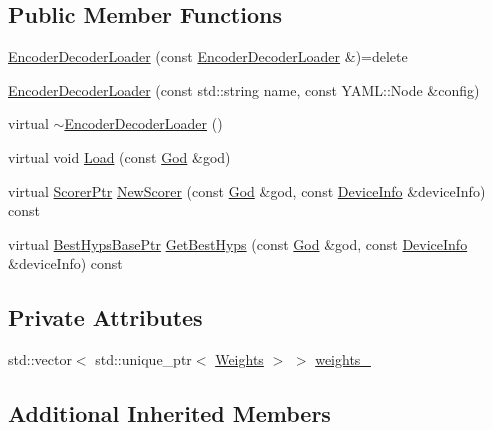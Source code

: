 \subsection*{Public Member Functions}
\begin{DoxyCompactItemize}
\item 
\hyperlink{classamunmt_1_1GPU_1_1EncoderDecoderLoader_ae76e1a60df4b709ddec5027089d45a78}{Encoder\+Decoder\+Loader} (const \hyperlink{classamunmt_1_1GPU_1_1EncoderDecoderLoader}{Encoder\+Decoder\+Loader} \&)=delete
\item 
\hyperlink{classamunmt_1_1GPU_1_1EncoderDecoderLoader_ae44ecf946eff763eb7d5b200831806be}{Encoder\+Decoder\+Loader} (const std\+::string name, const Y\+A\+M\+L\+::\+Node \&config)
\item 
virtual \hyperlink{classamunmt_1_1GPU_1_1EncoderDecoderLoader_ad635f6c9f1dd9baa2ce67251fd717236}{$\sim$\+Encoder\+Decoder\+Loader} ()
\item 
virtual void \hyperlink{classamunmt_1_1GPU_1_1EncoderDecoderLoader_a4f04240f2c79ce1d0e674a3b90c256e5}{Load} (const \hyperlink{classamunmt_1_1God}{God} \&god)
\item 
virtual \hyperlink{namespaceamunmt_a703e88438d533fef1db5cc95060b36f0}{Scorer\+Ptr} \hyperlink{classamunmt_1_1GPU_1_1EncoderDecoderLoader_a05b20df78aad262d9ef37c994f3c12eb}{New\+Scorer} (const \hyperlink{classamunmt_1_1God}{God} \&god, const \hyperlink{structamunmt_1_1DeviceInfo}{Device\+Info} \&device\+Info) const 
\item 
virtual \hyperlink{namespaceamunmt_a4a9522da34de52554ec07cedc30361b8}{Best\+Hyps\+Base\+Ptr} \hyperlink{classamunmt_1_1GPU_1_1EncoderDecoderLoader_a7436adba88a7f89f96d5c6ebf5ee8fe3}{Get\+Best\+Hyps} (const \hyperlink{classamunmt_1_1God}{God} \&god, const \hyperlink{structamunmt_1_1DeviceInfo}{Device\+Info} \&device\+Info) const 
\end{DoxyCompactItemize}
\subsection*{Private Attributes}
\begin{DoxyCompactItemize}
\item 
std\+::vector$<$ std\+::unique\+\_\+ptr$<$ \hyperlink{structamunmt_1_1GPU_1_1Weights}{Weights} $>$ $>$ \hyperlink{classamunmt_1_1GPU_1_1EncoderDecoderLoader_a5a68c1f435a2a5d899345756a4ad626e}{weights\+\_\+}
\end{DoxyCompactItemize}
\subsection*{Additional Inherited Members}


